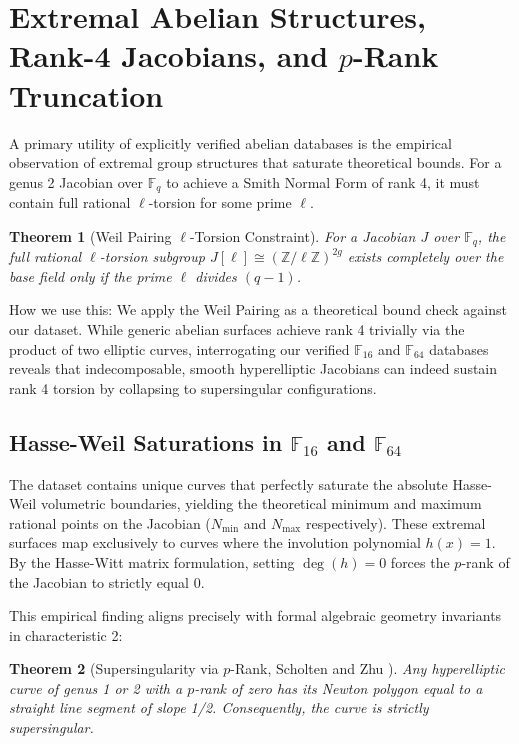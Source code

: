 \documentclass[letterpaper, 11pt]{article}
\newtheorem{theorem}{Theorem}[section]
\begin{document}
\section{Extremal Abelian Structures, Rank-4 Jacobians, and \texorpdfstring{$p$}{p}-Rank Truncation}
A primary utility of explicitly verified abelian databases is the empirical observation of extremal group structures that saturate theoretical bounds. For a genus 2 Jacobian over $\mathbb{F}_q$ to achieve a Smith Normal Form of rank 4, it must contain full rational $\ell$-torsion for some prime $\ell$.

\begin{theorem}[Weil Pairing $\ell$-Torsion Constraint]
For a Jacobian $J$ over $\mathbb{F}_q$, the full rational $\ell$-torsion subgroup $J[\ell] \cong (\mathbb{Z}/\ell\mathbb{Z})^{2g}$ exists completely over the base field only if the prime $\ell$ divides $(q-1)$.
\end{theorem}

How we use this: We apply the Weil Pairing as a theoretical bound check against our dataset. While generic abelian surfaces achieve rank 4 trivially via the product of two elliptic curves, interrogating our verified $\mathbb{F}_{16}$ and $\mathbb{F}_{64}$ databases reveals that indecomposable, smooth hyperelliptic Jacobians can indeed sustain rank 4 torsion by collapsing to supersingular configurations. 

\subsection{Hasse-Weil Saturations in \texorpdfstring{$\mathbb{F}_{16}$}{F\_16} and \texorpdfstring{$\mathbb{F}_{64}$}{F\_64}}
The dataset contains unique curves that perfectly saturate the absolute Hasse-Weil volumetric boundaries, yielding the theoretical minimum and maximum rational points on the Jacobian ($N_{\text{min}}$ and $N_{\text{max}}$ respectively). These extremal surfaces map exclusively to curves where the involution polynomial $h(x) = 1$. By the Hasse-Witt matrix formulation, setting $\deg(h) = 0$ forces the $p$-rank of the Jacobian to strictly equal 0. 

This empirical finding aligns precisely with formal algebraic geometry invariants in characteristic 2:
\begin{theorem}[Supersingularity via $p$-Rank, Scholten and Zhu \cite{Scholten2002}]
Any hyperelliptic curve of genus 1 or 2 with a $p$-rank of zero has its Newton polygon equal to a straight line segment of slope 1/2. Consequently, the curve is strictly supersingular.
\end{theorem}
\end{document}
